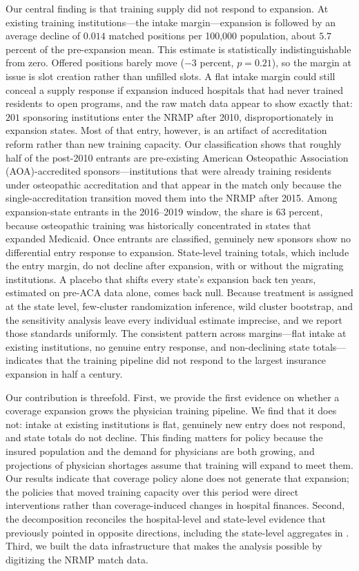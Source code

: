 Our central finding is that training supply did not respond to expansion. At existing training institutions---the intake margin---expansion is followed by an average decline of $0.014$ matched positions per 100{,}000 population, about $5.7$ percent of the pre-expansion mean. This estimate is statistically indistinguishable from zero. Offered positions barely move ($-3$ percent, $p = 0.21$), so the margin at issue is slot creation rather than unfilled slots. A flat intake margin could still conceal a supply response if expansion induced hospitals that had never trained residents to open programs, and the raw match data appear to show exactly that: $201$ sponsoring institutions enter the NRMP after 2010, disproportionately in expansion states. Most of that entry, however, is an artifact of accreditation reform rather than new training capacity. Our classification shows that roughly half of the post-2010 entrants are pre-existing American Osteopathic Association (AOA)-accredited sponsors---institutions that were already training residents under osteopathic accreditation and that appear in the match only because the single-accreditation transition moved them into the NRMP after 2015. Among expansion-state entrants in the 2016--2019 window, the share is $63$ percent, because osteopathic training was historically concentrated in states that expanded Medicaid. Once entrants are classified, genuinely new sponsors show no differential entry response to expansion. State-level training totals, which include the entry margin, do not decline after expansion, with or without the migrating institutions. A placebo that shifts every state's expansion back ten years, estimated on pre-ACA data alone, comes back null. Because treatment is assigned at the state level, few-cluster randomization inference, wild cluster bootstrap, and the \textcite{rambachan2023more} sensitivity analysis leave every individual estimate imprecise, and we report those standards uniformly. The consistent pattern across margins---flat intake at existing institutions, no genuine entry response, and non-declining state totals---indicates that the training pipeline did not respond to the largest insurance expansion in half a century.

Our contribution is threefold. First, we provide the first evidence on whether a coverage expansion grows the physician training pipeline. We find that it does not: intake at existing institutions is flat, genuinely new entry does not respond, and state totals do not decline. This finding matters for policy because the insured population and the demand for physicians are both growing, and projections of physician shortages assume that training will expand to meet them. Our results indicate that coverage policy alone does not generate that expansion; the policies that moved training capacity over this period were direct interventions rather than coverage-induced changes in hospital finances. Second, the decomposition reconciles the hospital-level and state-level evidence that previously pointed in opposite directions, including the state-level aggregates in \textcite{ang_beniwal2026}. Third, we built the data infrastructure that makes the analysis possible by digitizing the NRMP match data.


